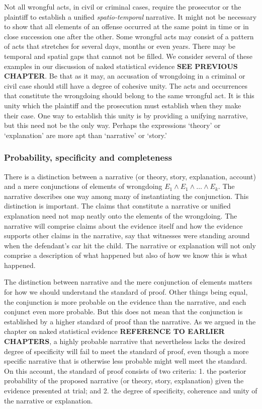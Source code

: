 \documentclass[
  10pt,
  dvipsnames,enabledeprecatedfontcommands]{scrartcl}
\newcommand{\mar}[1]{\todo[color=blue!40]{#1}}
\begin{document}
Not all wrongful acts, in civil or criminal cases, require the
prosecutor or the plaintiff to establish a unified
\emph{spatio-temporal} narrative. It might not be necessary to show that
all elements of an offense occurred at the same point in time or in
close succession one after the other. Some wrongful acts may consist of
a pattern of acts that stretches for several days, months or even years.
There may be temporal and spatial gaps that cannot not be filled. We
consider several of these examples in our discussion of naked
statistical evidence \textbf{SEE PREVIOUS CHAPTER}. Be that as it may,
an accusation of wrongdoing in a criminal or civil case should still
have a degree of cohesive unity. The acts and occurrences that
constitute the wrongdoing should belong to the same wrongful act. It is
this unity which the plaintiff and the prosecution must establish when
they make their case. One way to establish this unity is by providing a
unifying narrative, but this need not be the only way. Perhaps the
expressions `theory' or `explanation' are more apt than `narrative' or
`story.'

\hypertarget{probability-specificity-and-completeness}{%
\subsubsection{Probability, specificity and
completeness}\label{probability-specificity-and-completeness}}

There is a distinction between a narrative (or theory, story,
explanation, account) and a mere conjunctions of elements of wrongdoing
\(E_1\wedge E_1 \wedge \dots \wedge E_k\). The narrative describes one
way among many of instantiating the conjunction. This distinction is
important. The claims that constitute a narrative or unified explanation
need not map neatly onto the elements of the wrongdoing. The narrative
will comprise claims about the evidence itself and how the evidence
supports other claims in the narrative, say that witnesses were standing
around when the defendant's car hit the child. The narrative or
explanation will not only comprise a description of what happened but
also of how we know this is what happened.

The distinction between narrative and the mere conjunction of elements
matters for how we should understand the standard of proof. Other things
being equal, the conjunction is more probable on the evidence than the
narrative, and each conjunct even more probable. But this does not mean
that the conjunction is established by a higher standard of proof than
the narrative. As we argued in the chapter on naked statistical evidence
\textbf{REFERENCE TO EARLIER CHAPTERS},\mar{R: remember to add your paper to the folder.}
a highly probable narrative that nevertheless lacks the desired degree
of specificity will fail to meet the standard of proof, even though a
more specific narrative that is otherwise less probable might well meet
the standard. On this account, the standard of proof consists of two
criteria: 1. the posterior probability of the proposed narrative (or
theory, story, explanation) given the evidence presented at trial; and
2. the degree of specificity, coherence and unity of the narrative or
explanation.
\end{document}
